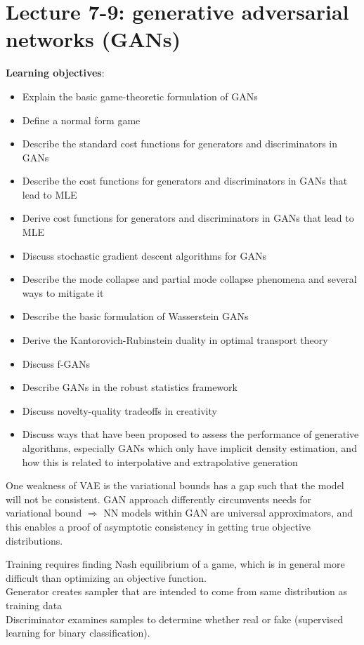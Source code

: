\documentclass[12pt,a4paper]{article}
\begin{document}
\section{Lecture 7-9: generative adversarial networks (GANs)}
\textbf{Learning objectives}:

\begin{itemize}
\item Explain the basic game-theoretic formulation of GANs
\item Define a normal form game
\item Describe the standard cost functions for generators and discriminators in GANs
\item Describe the cost functions for generators and discriminators in GANs that lead to MLE
\item Derive cost functions for generators and discriminators in GANs that lead to MLE
\item Discuss stochastic gradient descent algorithms for GANs
\item Describe the mode collapse and partial mode collapse phenomena and several ways to mitigate it
\item Describe the basic formulation of Wasserstein GANs
\item Derive the Kantorovich-Rubinstein duality in optimal transport theory
\item Discuss f-GANs
\item Describe GANs in the robust statistics framework
\item Discuss novelty-quality tradeoffs in creativity
\item Discuss ways that have been proposed to assess the performance of generative algorithms, especially GANs which only have implicit density estimation, and how this is related to interpolative and extrapolative generation
\end{itemize}

One weakness of VAE is the variational bounds has a gap such that the model will not be consistent. GAN approach differently circumvents needs for variational bound $\Rightarrow$ NN models within GAN are universal approximators, and this enables a proof of asymptotic consistency in getting true objective distributions.

Training requires finding Nash equilibrium of a game, which is in general more difficult than optimizing an objective function. \\
Generator creates sampler that are intended to come from same distribution as training data\\ 
Discriminator examines samples to determine whether real or fake (supervised learning for binary classification).
\end{document}
